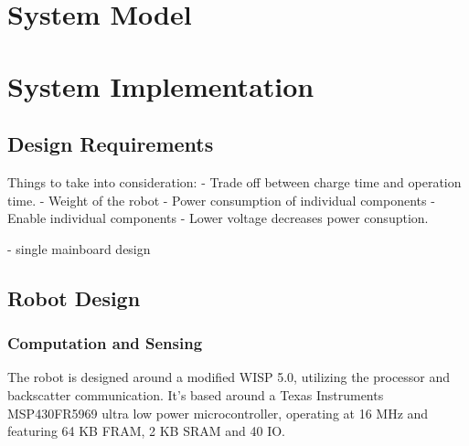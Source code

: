 \documentclass[letterpaper, 10 pt, conference]{ieeeconf}  %
\begin{document}
\section{System Model}


\section{System Implementation}

\subsection{Design Requirements}

Things to take into consideration:
- Trade off between charge time and operation time.
- Weight of the robot
- Power consumption of individual components
- Enable individual components
- Lower voltage decreases power consuption.

- single mainboard design







\subsection{Robot Design}




\subsubsection{Computation and Sensing}

The robot is designed around a modified WISP 5.0, utilizing the processor and backscatter communication.
It's based around a Texas Instruments MSP430FR5969 ultra low power microcontroller, operating at 16 MHz and featuring 64 KB FRAM, 2 KB SRAM and 40 IO. 

\end{document}
